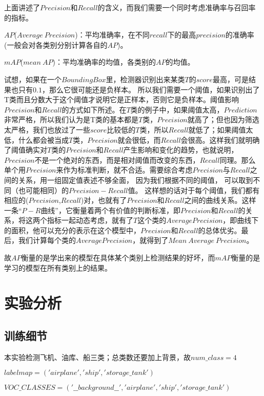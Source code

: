 上面讲述了$Precision$和$Recall$的含义，而我们需要一个同时考虑准确率与召回率的指标。

$AP$($Average\ Precision$)：平均准确率，在不同$recall$下的最高$precision$的准确率(一般会对各类别分别计算各自的$AP$)。

$mAP$($mean\ AP$)：平均准确率的均值，各类别的$AP$的均值。

试想，如果在一个$Bounding Box$里，检测器识别出来某类$T$的$score$最高，可是结果也只有$0.1$，那么它很可能还是负样本。 所以我们需要一个阈值，如果识别出了T类而且分数大于这个阈值才说明它是正样本，否则它是负样本。阈值影响$Precision$和$Recall$的方式如下所述。在$T$类的例子中，如果阈值太高，$Prediction$非常严格，所以我们认为是T类的基本都是$T$类，$Precision$就高了；但也因为筛选太严格，我们也放过了一些$score$比较低的$T$类，所以$Recall$就低了；如果阈值太低，什么都会被当成$T$类，$Precision$就会很低，而$Recall$会很高。这样我们就明确了阈值确实对$T$类的$Precision$和$Recall$产生影响和变化的趋势，也就说明，$Precision$不是一个绝对的东西，而是相对阈值而改变的东西，$Recall$同理。那么单个用$Precision$来作为标准判断，就不合适。需要综合考虑$Precision$与$Recall$之间的关系，用一组固定值表述不够全面， 因为我们根据不同的阈值， 可以取到不同（也可能相同）的$Precision-Recall$值。 这样想的话对于每个阈值，我们都有相应的($Precision$,$Recall$)对，也就有了$Precision$和$Recall$之间的曲线关系。这样一条“$P-R$曲线”，它衡量着两个有价值的判断标准，即$Precision$和$Recall$的关系，将这两个指标一起动态考虑，就有了$T$这个类的$Average Precision$，即曲线下的面积，他可以充分的表示在这个模型中，$Precision$和$Recall$的总体优劣。最后，我们计算每个类的$Average Precision$，就得到了$Mean\ Average\ Precision$。

故$AP$衡量的是学出来的模型在具体某个类别上检测结果的好坏，而$mAP$衡量的是学习的模型在所有类别上的结果。

\section{实验分析}

\subsection{训练细节}

本实验检测飞机、油库、船三类；总类数还要加上背景，故$num\_class=4$

$labelmap = ('airplane', 'ship', 'storage\_tank')$

$VOC\_CLASSES = ('\_\_background\_\_', 'airplane', 'ship', 'storage\_tank')$

